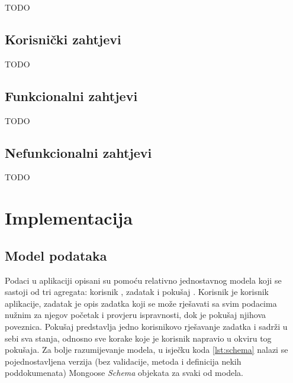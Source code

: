\documentclass[times, utf8, diplomski, numeric]{fer}
\begin{document}
TODO


\section{Korisnički zahtjevi}

TODO


\section{Funkcionalni zahtjevi}

TODO


\section{Nefunkcionalni zahtjevi}

TODO



\chapter{Implementacija}


\section{Model podataka} \label{sec:data}

Podaci u aplikaciji opisani su pomoću relativno jednostavnog modela koji se sastoji od tri agregata: korisnik , zadatak  i pokušaj .
Korisnik je korisnik aplikacije, zadatak je opis zadatka koji se može rješavati sa svim podacima nužnim za njegov početak i provjeru ispravnosti, dok je pokušaj njihova poveznica.
Pokušaj predstavlja jedno korisnikovo rješavanje zadatka i sadrži u sebi sva stanja, odnosno sve korake koje je korisnik napravio u okviru tog pokušaja.
Za bolje razumijevanje modela, u isječku koda \ref{lst:schema} nalazi se pojednostavljena verzija (bez validacije, metoda i definicija nekih poddokumenata) Mongoose \emph{Schema} objekata za svaki od modela.
\end{document}
